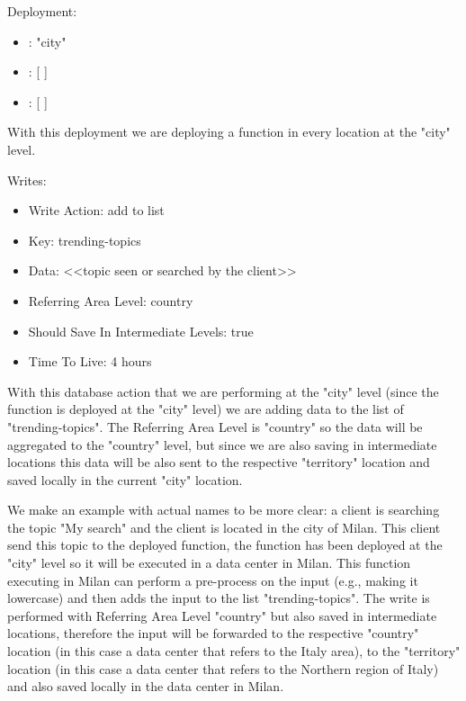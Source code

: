\begin{example}
Deployment:
\begin{itemize}
    \item {}: "city"
    \item {}: [ ]
    \item {}: [ ]
\end{itemize}
With this deployment we are deploying a function in every location at the "city" level.

Writes:
\begin{itemize}
    \item Write Action: add to list
    \item Key: trending-topics
    \item Data: <<topic seen or searched by the client>>
    \item Referring Area Level: country
    \item Should Save In Intermediate Levels: true
    \item Time To Live: 4 hours
\end{itemize}
With this database action that we are performing at the "city" level (since the function is deployed at the "city" level) we are adding data to the list of "trending-topics". The Referring Area Level is "country" so the data will be aggregated to the "country" level, but since we are also saving in intermediate locations this data will be also sent to the respective "territory" location and saved locally in the current "city" location.

We make an example with actual names to be more clear: a client is searching the topic "My search" and the client is located in the city of Milan. This client send this topic to the deployed function, the function has been deployed at the "city" level so it will be executed in a data center in Milan. This function executing in Milan can perform a pre-process on the input (e.g., making it lowercase) and then adds the input to the list "trending-topics". The write is performed with Referring Area Level "country" but also saved in intermediate locations, therefore the input will be forwarded to the respective "country" location (in this case a data center that refers to the Italy area), to the "territory" location (in this case a data center that refers to the Northern region of Italy) and also saved locally in the data center in Milan.
\end{example}

